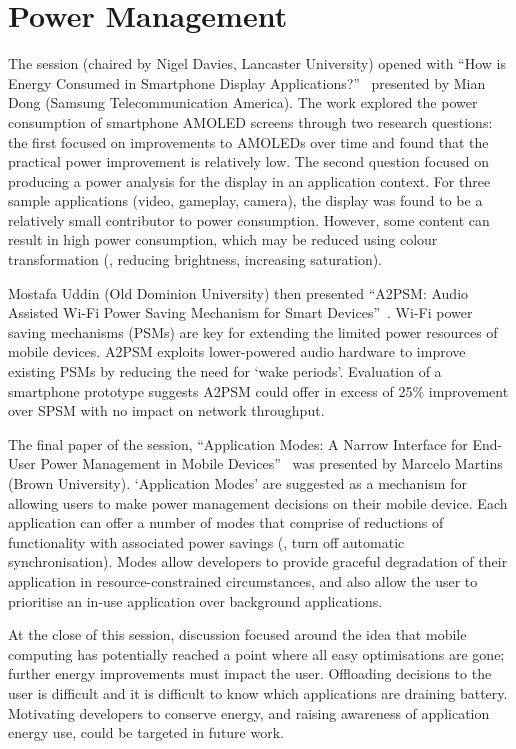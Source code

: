 \section{Power Management}
\label{sec:power}
The session (chaired by Nigel Davies, Lancaster University)
opened with
``How is Energy Consumed in Smartphone Display
Applications?''~\cite{chen13} presented by Mian Dong (Samsung
Telecommunication America). The work explored
the power consumption of smartphone AMOLED screens through two research questions: the first focused on improvements to AMOLEDs over time
and found that the practical power improvement is relatively low.
The second question focused on 
producing a power analysis for the display in an application context. For three 
sample applications (video, gameplay, camera), the display was found to be a 
relatively small contributor to power consumption. However, some content can result in high power consumption, which may be reduced using colour 
transformation (\eg{}, reducing brightness, increasing saturation).

Mostafa Uddin (Old Dominion University) then presented ``A2PSM: Audio Assisted 
Wi-Fi Power Saving Mechanism for Smart Devices''~\cite{uddin13}. Wi-Fi
power saving mechanisms 
(PSMs) are key for extending the limited power resources of mobile devices. 
A2PSM exploits lower-powered audio hardware to 
improve existing PSMs by reducing the need for `wake periods'. 
Evaluation of a smartphone prototype suggests A2PSM could offer in excess of 25\%
improvement over SPSM with no impact on network throughput.

The final paper of the session, ``Application Modes: A Narrow Interface for End-
User Power Management in Mobile Devices''~\cite{martins13} was presented
by Marcelo Martins (Brown 
University). `Application Modes' are suggested as a mechanism for allowing 
users to make power management decisions on their mobile device. Each 
application can offer a number of modes that comprise of reductions of 
functionality with associated power savings (\eg{}, turn off automatic 
synchronisation). Modes allow developers to provide graceful degradation of their 
application in resource-constrained circumstances, and also allow the user to 
prioritise an in-use application over background applications.

At the close of this session, discussion focused around the idea
that mobile computing has potentially reached a point where all easy 
optimisations are gone; further energy improvements must impact the 
user. Offloading decisions to the user is difficult and it is difficult to 
know which applications are draining battery. Motivating 
developers to conserve energy, and raising awareness of application energy use, 
could be targeted in future work. %

